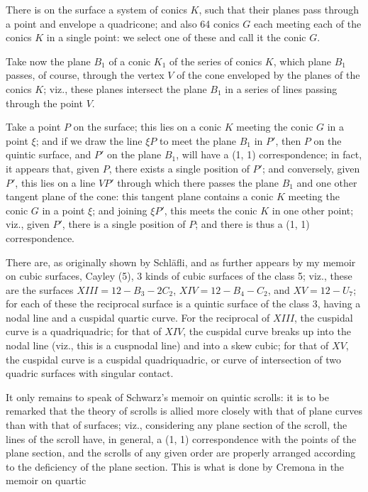 \documentclass[11pt]{article}
\begin{document}
There is on the surface a system of conics $K$, such that their planes pass through
a point and envelope a quadricone; and also 64 conics $G$ each meeting each of the
conics $K$ in a single point: we select one of these and call it the conic $G$.

Take now the plane $B_1$ of a conic $K_1$ of the series of conics $K$, which plane $B_1$
passes, of course, through the vertex $V$ of the cone enveloped by the planes of the
conics $K$; viz., these planes intersect the plane $B_1$ in a series of lines passing through
the point $V$.

Take a point $P$ on the surface; this lies on a conic $K$ meeting the conic $G$ in
a point $\xi$; and if we draw the line $\xi P$ to meet the plane $B_1$ in $P'$, then $P$ on
the quintic surface, and $P'$ on the plane $B_1$, will have a (1, 1) correspondence; in
fact, it appears that, given $P$, there exists a single position of $P'$; and conversely,
given $P'$, this lies on a line $VP'$ through which there passes the plane $B_1$ and one
other tangent plane of the cone: this tangent plane contains a conic $K$ meeting
the conic $G$ in a point $\xi$; and joining $\xi P'$, this meets the conic $K$ in one other point;
viz., given $P'$, there is a single position of $P$; and there is thus a (1, 1) correspondence.

There are, as originally shown by Schl\"afli, and as further appears by my memoir
on cubic surfaces, Cayley (5), 3 kinds of cubic surfaces of the class 5; viz., these are
the surfaces $XIII = 12 - B_3 - 2C_2$, $XIV = 12 - B_4 - C_2$, and $XV = 12 - U_7$; for each of
these the reciprocal surface is a quintic surface of the class 3, having a nodal line
and a cuspidal quartic curve. For the reciprocal of $XIII$, the cuspidal curve is a
quadriquadric; for that of $XIV$, the cuspidal curve breaks up into the nodal line (viz.,
this is a cuspnodal line) and into a skew cubic; for that of $XV$, the cuspidal curve is
a cuspidal quadriquadric, or curve of intersection of two quadric surfaces with singular
contact.

It only remains to speak of Schwarz's memoir on quintic scrolls: it is to be
remarked that the theory of scrolls is allied more closely with that of plane curves
than with that of surfaces; viz., considering any plane section of the scroll, the lines
of the scroll have, in general, a (1, 1) correspondence with the points of the plane section,
and the scrolls of any given order are properly arranged according to the deficiency
of the plane section. This is what is done by Cremona in the memoir on quartic
\end{document}
